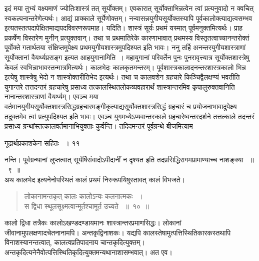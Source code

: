 \documentclass[11pt, openany]{book}
\begin{document}
\noindent  इदं मया तुभ्यं वक्ष्यमाणं ज्योतिःशास्त्रं तत् सूर्योक्तम्। एवकारात् सूर्योक्ताभिन्नत्वेन त्वां प्रत्यनुवादो न क्वचित् स्वकल्पनान्तरेणेत्यर्थः। आद्यं प्राक्काले सूर्येणोक्तम्। नन्वासन्नयुगीयसूर्योक्तस्यापि पूर्वकालोक्त्याद्यत्वसम्भव इत्यतस्तत्पदापेक्षितमाद्यपदविवरणरूपमाह। यदिति। शास्त्रं सूर्यः प्रथमं यस्मात् पूर्वमनुक्तमित्यर्थः। प्राह प्रकर्षेण विस्तरेण मुनीन् प्रत्युक्तवान्। तथा च प्रथमातिरेके कारणाभावात् प्रथमस्य विस्तृतत्वाच्चानन्तरोक्तं पूर्वोक्ते गतार्थतया संक्षिप्तमुपेक्ष्य प्रथमयुगीयशास्त्रमुपदिश्यत इति भावः। ननु तर्हि अनन्तरयुगीयशास्त्राणां सूर्योक्तानां वैयर्थ्यप्रसङ्ग इत्यत आह\textendash युगानामिति~। महायुगानां परिवर्तेन पुनः पुनरावृत्त्यात्र सूर्योक्तशास्त्रेषु केवलं स्वभिन्नाभावस्तन्मात्रमित्यर्थः। कालभेदः कालकृतमन्तरम्। पूर्वशास्त्रकालादनन्तरशास्त्रकालो भिन्न इत्येषु शास्त्रेषु भेदो न शास्त्रोक्तरीतिभेद इत्यर्थः। तथा च कालवशेन ग्रहचारे किञ्चिद्वैलक्षण्यं भवतीति युगान्तरे तत्तदन्तरं ग्रहचारेषु प्रसाध्य तत्कालस्थितलोकव्यवहारार्थं शास्त्रान्तरमिव कृपालुरुक्तवानिति नानान्तरशास्त्राणां वैयर्थ्यम्। एवञ्च मया वर्तमानयुगीयसूर्योक्तशास्त्रसिद्धग्रहचारमङ्गीकृत्याद्यसूर्योक्तशास्त्रसिद्धं ग्रहचारं च प्रयोजनाभावादुपेक्ष्य तदुक्तमेव त्वां प्रत्युपदिश्यत इति भावः। एवञ्च युगमध्येऽप्यवान्तरकाले ग्रहचारेष्वन्तरदर्शने तत्तत्काले तदन्तरं प्रसाध्य ग्रन्थांस्तत्कालवर्तमानाभियुक्ताः कुर्वन्ति। तदिदमन्तरं पूर्वग्रन्थे बीजमित्याम\textendash

\newpage


\hspace{3cm} गूढार्थप्रकाशकेन सहितः ~। \hfill ११
\vspace{1cm}
 
\noindent नन्ति। पूर्वग्रन्थानां लुप्तत्वात् सूर्यर्षिसंवादोऽपीदानीं न दृश्यत इति तदप्रसिद्धिरागमप्रामाण्याच्च नाशङ्क्या ~॥~९~॥\\
\noindent अथ कालभेद इत्यनेनोपस्थितं कालं प्रथमं निरुरूपयिषुस्तावत् कालं विभजते।


\begin{quote}
 {\ssi लोकानामन्तकृत् कालः कालोऽन्यः कलनात्मकः ~।\\
स द्विधा स्थूलसूक्ष्मत्वान्मूर्तश्चामूर्त उच्यते ~॥~१०~॥}
\end{quote}
\begin{sloppypar}
 कालो द्विधा तत्रैकः कालोऽखण्डदण्डायमानः शास्त्रान्तरप्रमाणसिद्धः। लोकानां जीवानामुपलक्षणादचेतनानामपि। अन्तकृद्विनाशकः। यद्यपि कालस्तेषामुत्पत्तिस्थितिकारकस्तथापि विनाशस्यानन्तत्वात्, कालत्वप्रतिपादनाय चान्तकृदित्युक्तम्। अन्तकृदित्यनेनैवोत्पत्तिस्थितिकृदित्युक्तमन्यथानाशासम्भवात्। अत एव।
\end{sloppypar}
\end{document}
